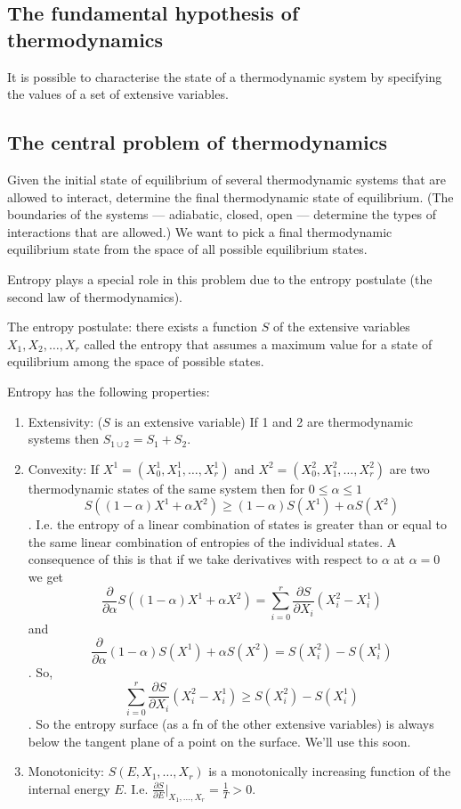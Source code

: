 \documentclass{article}
\begin{document}
\subsection*{The fundamental hypothesis of thermodynamics}
It is possible to characterise the state of a thermodynamic system by specifying the values of a set of extensive variables.

\subsection*{The central problem of thermodynamics}
Given the initial state of equilibrium of several thermodynamic systems that are allowed to interact, determine the final thermodynamic state of equilibrium. (The boundaries of the systems --- adiabatic, closed, open --- determine the types of interactions that are allowed.) We want to pick a final thermodynamic equilibrium state from the space of all possible equilibrium states.

Entropy plays a special role in this problem due to the entropy postulate (the second law of thermodynamics).

The entropy postulate: there exists a function $S$ of the extensive variables $X_1,X_2,\ldots,X_r$ called the entropy that assumes a maximum value for a state of equilibrium among the space of possible states.

Entropy has the following properties:
\begin{enumerate}
\item Extensivity: ($S$ is an extensive variable) If 1 and 2 are thermodynamic systems then $S_{1\cup2}=S_1+S_2$.
\item Convexity: If $X^1=(X_0^1,X_1^1,\ldots,X_r^1)$ and  $X^2=(X_0^2,X_1^2,\ldots,X_r^2)$ are two thermodynamic states of the same system then for $0\leq\alpha\leq1$
$$ S((1-\alpha)X^1+\alpha X^2)\geq (1-\alpha)S(X^1)+\alpha S(X^2) $$.
I.e. the entropy of a linear combination of states is greater than or equal to the same linear combination of entropies of the individual states.
A consequence of this is that if we take derivatives with respect to $\alpha$ at $\alpha=0$ we get
$$\frac{\partial}{\partial \alpha} S((1-\alpha)X^1+\alpha X^2) = \sum_{i=0}^r\frac{\partial S}{\partial X_i}(X_i^2-X_i^1)$$
and
$$\frac{\partial}{\partial \alpha} (1-\alpha)S(X^1)+\alpha S(X^2) = S(X_i^2)-S(X_i^1)$$.
So,
$$ \sum_{i=0}^r\frac{\partial S}{\partial X_i}(X_i^2-X_i^1)\geq  S(X_i^2)-S(X_i^1)$$.
So the entropy surface (as a fn of the other extensive variables) is always below the tangent plane of a point on the surface. We'll use this soon.
\item Monotonicity: $S(E,X_1,\ldots,X_r)$ is a monotonically increasing function of the internal energy $E$. I.e. $\frac{\partial S}{\partial E}\vert_{X_1,\ldots,X_r} = \frac{1}{T}>0$.
\end{enumerate}
\end{document}
